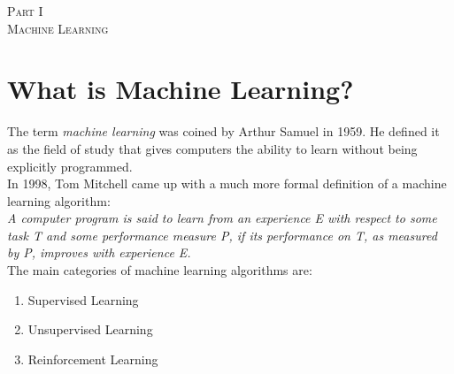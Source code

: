 \documentclass[a4paper, 12pt]{report}
\begin{document}
\vspace*{\fill}

\newpage

\tableofcontents

\newpage


\vspace*{\fill}
\begin{center}
{\huge\scshape Part I \\\vspace{1cm} Machine Learning}
\end{center}
\vspace*{\fill}

\newpage

\chapter{What is Machine Learning?}
The term \textit{machine learning} was coined by Arthur Samuel in 1959. He defined it as the field of study that gives computers the ability to learn without being explicitly programmed. \\
\break
In 1998, Tom Mitchell came up with a much more formal definition of a machine learning algorithm: \\
\textit{A computer program is said to learn from an experience E with respect to some task T and some performance measure P, if its performance on T, as measured by P, improves with experience E.} \\
\break
The main categories of machine learning algorithms are:
\begin{enumerate}
\item Supervised Learning
\item Unsupervised Learning
\item Reinforcement Learning
\end{enumerate}
\end{document}
